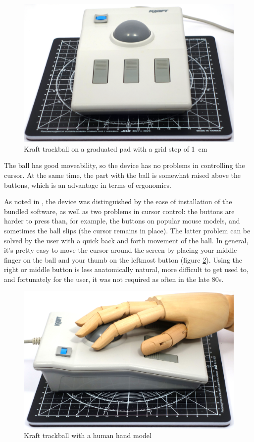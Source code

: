 \documentclass[11pt, a4paper]{article}
\begin{document}
\begin{figure}[h]
    \centering
    \includegraphics[scale=0.25]{1989_kraft_trackball/size_30.jpg}
    \caption{Kraft trackball on a graduated pad with a grid step of 1~cm}
    \label{fig:KraftSize}
\end{figure}

The ball has good moveability, so the device has no problems in controlling the cursor. At the same time, the part with the ball is somewhat raised above the buttons, which is an advantage in terms of ergonomics.

As noted in \cite{Hudnall}, the device was distinguished by the ease of installation of the bundled software, as well as two problems in cursor control: the buttons are harder to press than, for example, the buttons on popular mouse models, and sometimes the ball slips (the cursor remains in place). The latter problem can be solved by the user with a quick back and forth movement of the ball. In general, it's pretty easy to move the cursor around the screen by placing your middle finger on the ball and your thumb on the leftmost button (figure \ref{fig:KraftHand}). Using the right or middle button is less anatomically natural, more difficult to get used to, and fortunately for the user, it was not required as often in the late 80s.

\begin{figure}[h]
    \centering
    \includegraphics[scale=0.25]{1989_kraft_trackball/hand_30.jpg}
    \caption{Kraft trackball with a human hand model}
    \label{fig:KraftHand}
\end{figure}
\end{document}
